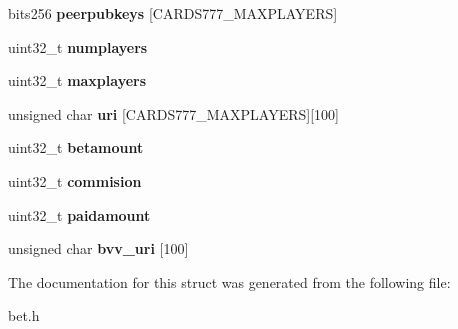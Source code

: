 \begin{DoxyCompactItemize}
bits256 {\bfseries peerpubkeys} \mbox{[}C\+A\+R\+D\+S777\+\_\+\+M\+A\+X\+P\+L\+A\+Y\+E\+RS\mbox{]}
\item 
\mbox{\label{structdeck__dcv__info_a533796e39e541718a2aab0d61414612b}} 
uint32\+\_\+t {\bfseries numplayers}
\item 
\mbox{\label{structdeck__dcv__info_a95db599c4f330024040c6c9b7c46d5ef}} 
uint32\+\_\+t {\bfseries maxplayers}
\item 
\mbox{\label{structdeck__dcv__info_ac019b3b109ead05c7d6d76846603399b}} 
unsigned char {\bfseries uri} \mbox{[}C\+A\+R\+D\+S777\+\_\+\+M\+A\+X\+P\+L\+A\+Y\+E\+RS\mbox{]}\mbox{[}100\mbox{]}
\item 
\mbox{\label{structdeck__dcv__info_abf784ce3b599f9ca61608210559c56f9}} 
uint32\+\_\+t {\bfseries betamount}
\item 
\mbox{\label{structdeck__dcv__info_a49c38791b251048ff83d948f76154441}} 
uint32\+\_\+t {\bfseries commision}
\item 
\mbox{\label{structdeck__dcv__info_a7cf6f1023e1245a8b19b87f63fa64e7a}} 
uint32\+\_\+t {\bfseries paidamount}
\item 
\mbox{\label{structdeck__dcv__info_a1415902499c43e3c0a4ba1f75fbdfeaf}} 
unsigned char {\bfseries bvv\+\_\+uri} \mbox{[}100\mbox{]}
\end{DoxyCompactItemize}


The documentation for this struct was generated from the following file\+:\begin{DoxyCompactItemize}
\item 
bet.\+h\end{DoxyCompactItemize}
